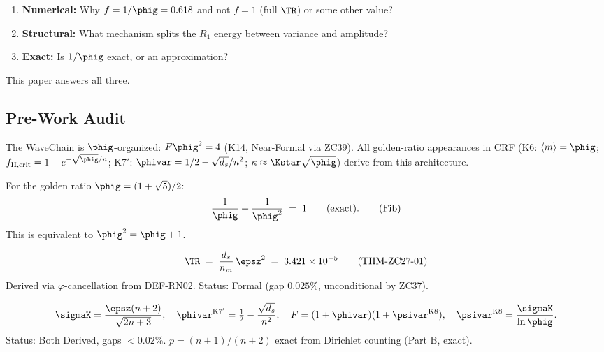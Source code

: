 \documentclass[12pt, a4paper]{article}
\begin{document}
\begin{enumerate}[leftmargin=*,noitemsep]
  \item \textbf{Numerical:} Why $f = 1/\phig = 0.618$ and not $f = 1$
    (full $\TR$) or some other value?
  \item \textbf{Structural:} What mechanism splits the $R_1$ energy
    between variance and amplitude?
  \item \textbf{Exact:} Is $1/\phig$ exact, or an approximation?
\end{enumerate}

This paper answers all three.

\subsection{Pre-Work Audit}
\label{sec:pwa}

\begin{formalbox}[title={Pillar 1: WaveChain $\phig$-Architecture (Part B, K14)}]
The WaveChain is $\phig$-organized: $F\phig^2 = 4$ (K14, Near-Formal via ZC39).
All golden-ratio appearances in CRF (K6: $\langle m\rangle = \phig$;
$f_{\rm II,crit} = 1 - e^{-\sqrt{\phig}/n}$; K7$'$: $\phivar = 1/2 - \sqrt{d_s}/n^2$;
$\kappa \approx \Kstar\sqrt{\phig}$) derive from this architecture.
\end{formalbox}

\begin{formalbox}[title={Pillar 2: Fibonacci Identity (Mathematical, Exact)}]
For the golden ratio $\phig = (1+\sqrt{5})/2$:
\[
  \frac{1}{\phig} + \frac{1}{\phig^2} \;=\; 1 \qquad \text{(exact).}
  \tag{Fib}
\]
This is equivalent to $\phig^2 = \phig + 1$.
\end{formalbox}

\begin{formalbox}[title={Pillar 3: THM-ZC27-01 --- $R_1$ Crossing Cost (ZC27, formal)}]
\[
  \TR \;=\; \frac{d_s}{n_m}\,\epsz^2 \;=\; 3.421\times 10^{-5}
  \tag{THM-ZC27-01}
\]
Derived via $\varphi$-cancellation from DEF-RN02.
Status: Formal (gap $0.025\%$, unconditional by ZC37).
\end{formalbox}

\begin{formalbox}[title={Pillar 4: K8 and K7$'$ --- WaveChain Formulas (Part B)}]
\[
  \sigmaK = \frac{\epsz(n+2)}{\sqrt{2n+3}}, \quad
  \phivar^{\rm K7'} = \tfrac{1}{2} - \frac{\sqrt{d_s}}{n^2},
  \quad F = (1+\phivar)(1+\psivar^{\rm K8}), \quad
  \psivar^{\rm K8} = \frac{\sigmaK}{\ln\phig}.
\]
Status: Both Derived, gaps $< 0.02\%$.
$p = (n+1)/(n+2)$ exact from Dirichlet counting (Part B, exact).
\end{formalbox}
\end{document}
